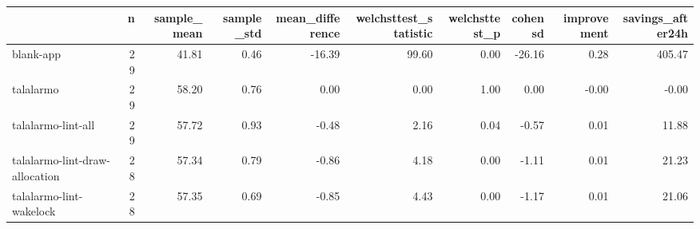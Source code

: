 \begin{tabular}{lrrrrrrrrr}
\toprule
{} &   n &  sample\_mean &  sample\_std &  mean\_difference &  welchsttest\_statistic &  welchsttest\_p &  cohensd &  improvement &  savings\_after24h \\
\midrule
blank-app                      &  29 &        41.81 &        0.46 &           -16.39 &                  99.60 &           0.00 &   -26.16 &         0.28 &            405.47 \\
talalarmo                      &  29 &        58.20 &        0.76 &             0.00 &                   0.00 &           1.00 &     0.00 &        -0.00 &             -0.00 \\
talalarmo-lint-all             &  29 &        57.72 &        0.93 &            -0.48 &                   2.16 &           0.04 &    -0.57 &         0.01 &             11.88 \\
talalarmo-lint-draw-allocation &  28 &        57.34 &        0.79 &            -0.86 &                   4.18 &           0.00 &    -1.11 &         0.01 &             21.23 \\
talalarmo-lint-wakelock        &  28 &        57.35 &        0.69 &            -0.85 &                   4.43 &           0.00 &    -1.17 &         0.01 &             21.06 \\
\bottomrule
\end{tabular}
